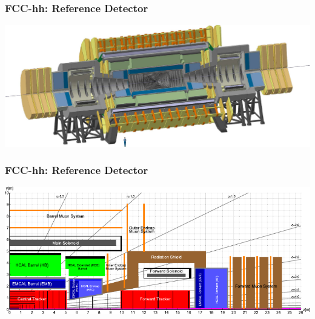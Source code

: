 \documentclass[aspectratio=169]{beamer}
\newcommand{\backupend}{%
   \setcounter{framenumber}{\value{finalframe}}
}
\begin{document}
\begin{frame}
  \frametitle{FCC-hh: Reference Detector}

  \begin{adjustwidth}{-2em}{-2em}
    \includegraphics[width=\linewidth]{figures/FCC_hh_ref_detector.png}
  \end{adjustwidth}
\end{frame}

\begin{frame}
  \frametitle{FCC-hh: Reference Detector}

  \begin{adjustwidth}{-2em}{-2em}
    \includegraphics[width=\linewidth]{figures/FCC_hh_ref_detector_xsec.pdf}
  \end{adjustwidth}
\end{frame}

\backupend{}
\end{document}
